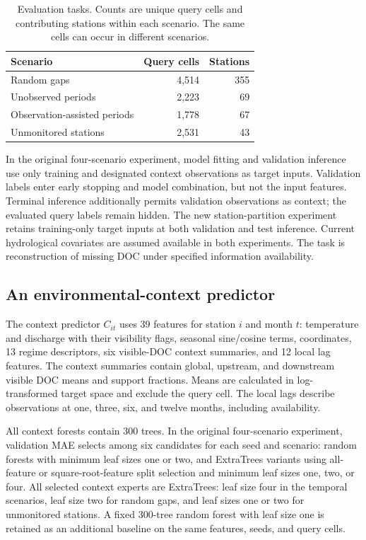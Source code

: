 \documentclass[11pt]{article}
\begin{document}
\begin{table}[htbp]\centering\small
\caption{Evaluation tasks. Counts are unique query cells and contributing stations within each scenario. The same cells can occur in different scenarios.}
\label{tab:scenarios}
\begin{tabular}{>{\raggedright\arraybackslash}p{4.3cm}rr}\toprule
Scenario & Query cells & Stations\\\midrule
Random gaps & 4,514 & 355\\
Unobserved periods & 2,223 & 69\\
Observation-assisted periods & 1,778 & 67\\
Unmonitored stations & 2,531 & 43\\
\bottomrule\end{tabular}
\end{table}

In the original four-scenario experiment, model fitting and validation inference use only training and designated context observations as target inputs. Validation labels enter early stopping and model combination, but not the input features. Terminal inference additionally permits validation observations as context; the evaluated query labels remain hidden. The new station-partition experiment retains training-only target inputs at both validation and test inference. Current hydrological covariates are assumed available in both experiments. The task is reconstruction of missing DOC under specified information availability.

\subsection{An environmental-context predictor}
The context predictor $C_{it}$ uses 39 features for station $i$ and month $t$: temperature and discharge with their visibility flags, seasonal sine/cosine terms, coordinates, 13 regime descriptors, six visible-DOC context summaries, and 12 local lag features. The context summaries contain global, upstream, and downstream visible DOC means and support fractions. Means are calculated in log-transformed target space and exclude the query cell. The local lags describe observations at one, three, six, and twelve months, including availability.

All context forests contain 300 trees. In the original four-scenario experiment, validation MAE selects among six candidates for each seed and scenario: random forests with minimum leaf sizes one or two, and ExtraTrees variants using all-feature or square-root-feature split selection and minimum leaf sizes one, two, or four. All selected context experts are ExtraTrees: leaf size four in the temporal scenarios, leaf size two for random gaps, and leaf sizes one or two for unmonitored stations. A fixed 300-tree random forest with leaf size one is retained as an additional baseline on the same features, seeds, and query cells.
\end{document}
